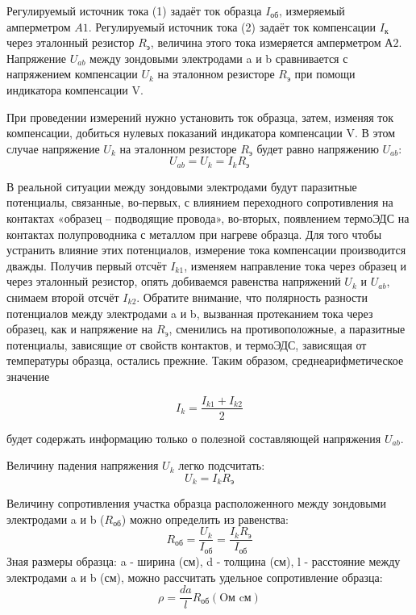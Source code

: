 Регулируемый источник тока (1) задаёт ток образца $I_\text{об}$, измеряемый амперметром $A1$. Регулируемый источник тока
(2) задаёт ток компенсации $I_\text{к}$ через эталонный резистор $R_\text{э}$, величина этого тока измеряется
амперметром $А2$. Напряжение $U_{ab}$ между зондовыми электродами a и b сравнивается с напряжением компенсации $U_k$ на
эталонном резисторе $R_\text{э}$ при помощи индикатора компенсации V.

При проведении измерений нужно установить ток образца, затем, изменяя ток компенсации, добиться нулевых показаний
индикатора компенсации V. В этом случае напряжение $U_k$ на эталонном резисторе $R_\text{э}$ будет равно напряжению $U_{ab}$:
\begin{equation}
	U_{ab}=U_{k}=I_{k} R_{\text{э}} 
	\label{eq:5.1}
\end{equation}

В реальной ситуации между зондовыми электродами будут паразитные потенциалы, связанные, во-первых, с влиянием
переходного сопротивления на контактах «образец – подводящие провода», во-вторых, появлением термоЭДС на контактах
полупроводника с металлом при нагреве образца. Для того чтобы устранить влияние этих потенциалов, измерение тока
компенсации производится дважды. Получив первый отсчёт $I_{k1}$, изменяем направление тока через образец и через
эталонный резистор, опять добиваемся равенства напряжений $U_k$ и $U_{ab}$, снимаем второй отсчёт $I_{k2}$. Обратите
внимание, что полярность разности потенциалов между электродами a и b, вызванная протеканием тока через образец, как и
напряжение на $R_\text{э}$, сменились на противоположные, а паразитные потенциалы, зависящие от свойств контактов, и
термоЭДС, зависящая от температуры образца, остались прежние. Таким образом, среднеарифметическое значение 

$$I_k=\frac{I_{k1}+I_{k2}}{2}$$

будет содержать информацию только о полезной составляющей напряжения $U_{ab}$.

Величину падения напряжения $U_k$ легко подсчитать:
$$U_{k}=I_{k} R_{\text{э}}$$

Величину сопротивления участка образца расположенного между зондовыми электродами a и b ($R_{\text{об}}$) можно определить из равенства:
$$R_{\text{об}}=\frac{U_{k}}{I_{\text{об}}}=\frac{I_{k} R_{\text{э}}}{I_{\text{об}}}$$
Зная размеры образца: a - ширина (см), d - толщина (см), l - расстояние между электродами a и b (см), можно рассчитать удельное сопротивление образца:
$$\rho=\frac{d a}{l} R_{\text{об}} (\text{Oм} \text{ cм})$$

